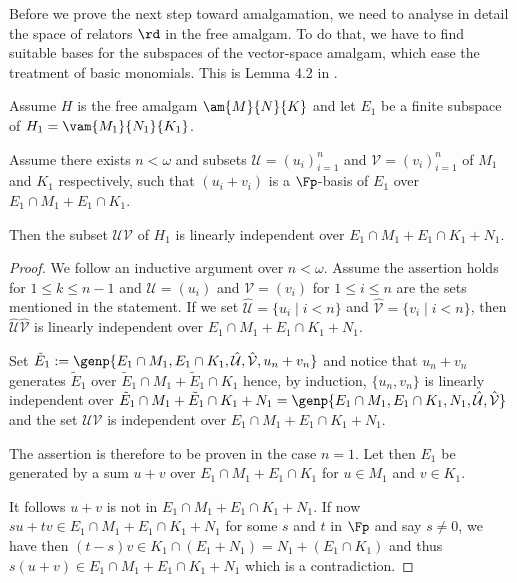 \medskip
Before we prove the next step toward amalgamation, we need to analyse in detail the space of relators $\rd$ in the free amalgam.
To do that, we have to find suitable bases for the subspaces of the vector-space amalgam, which
ease the treatment of basic monomials. This is Lemma 4.2 in \cite{bad}.
\begin{lem}\label{basE}
Assume $H$ is the free amalgam $\am{M}{N}{K}$ and let $E_{1}$ be a finite subspace of $H_{1}=\vam{M_{1}}{N_{1}}{K_{1}}$.

Assume there exists $n<\omega$ and subsets $\mathcal{U}=(u_{i})_{i=1}^{n}$ and $\mathcal{V}=(v_{i})_{i=1}^{n}$
of $M_{1}$ and $K_{1}$ respectively, such that $(u_{i}+v_{i})$ is a $\Fp$-basis
of $E_{1}$ over $E_{1}\cap M_{1}+E_{1}\cap K_{1}$.

Then the subset $\mathcal{UV}$ of $H_{1}$ is linearly independent over $E_{1}\cap M_{1}+E_{1}\cap K_{1}+N_{1}$.
\end{lem}
\begin{proof}
We follow an inductive argument over $n<\omega$. Assume the assertion holds for $1\leq k\leq n-1$ and
$\mathcal{U}=(u_{i})$ and $\mathcal{V}=(v_{i})$ for $1\leq i\leq n$ are the sets mentioned in the statement.
If we set $\hat{\mathcal{U}}=\{u_{i}\mid i<n\}$ and $\hat{\mathcal{V}}=\{v_{i}\mid i<n\}$, then
$\hat{\mathcal{U}}\hat{\mathcal{V}}$ is linearly independent over $E_{1}\cap M_{1}+E_{1}\cap K_{1}+N_{1}$.

Set $\tilde{E}_{1}:=\genp{E_{1}\cap M_{1},E_{1}\cap K_{1},\hat{\mathcal{U}},\hat{\mathcal{V}},u_{n}+v_{n}}$ and notice
that $u_{n}+v_{n}$ generates $\tilde{E}_{1}$ over $\tilde{E}_{1}\cap M_{1}+\tilde{E}_{1}\cap K_{1}$ hence, by induction,
$\{u_{n},v_{n}\}$ is linearly independent over $\tilde{E}_{1}\cap M_{1}+\tilde{E}_{1}\cap K_{1}+N_{1}=
\genp{E_{1}\cap M_{1},E_{1}\cap K_{1},N_{1},\hat{\mathcal{U}},\hat{\mathcal{V}}}$ and
the set $\mathcal{UV}$ is independent over $E_{1}\cap M_{1}+E_{1}\cap K_{1}+N_{1}$.

The assertion is therefore to be proven in the case $n=1$.
Let then $E_{1}$ be generated by a sum $u+v$ over
$E_{1}\cap M_{1}+E_{1}\cap K_{1}$ for $u\in M_{1}$ and $v\in K_{1}$.


It follows $u+v$ is not in $E_{1}\cap M_{1}+E_{1}\cap K_{1}+N_{1}$.
If now $su+tv \in E_{1}\cap M_{1}+E_{1}\cap K_{1}+N_{1}$ for some $s$ and $t$ in $\Fp$ and
say $s\neq0$, we have then $%
(t-s)v\in K_{1}\cap (E_{1} +N_{1})=N_{1}+(E_{1}\cap K_{1})$ and thus $s(u+v)\in E_{1}\cap M_{1}+E_{1}\cap K_{1}+N_{1}$ which is a contradiction.
\end{proof}

